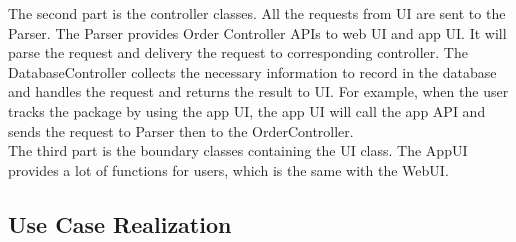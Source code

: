 \documentclass[12pt]{scrreprt}
\begin{document}
The second part is the controller classes. All the requests from UI are sent to the Parser. The Parser provides Order Controller APIs to web UI and app UI. It will parse the request and delivery the request to corresponding controller. The DatabaseController collects the necessary information to record in the database and handles the request and returns the result to UI. For example, when the user tracks the package by using the app UI, the app UI will call the app API and sends the request to Parser then to the OrderController.\\
The third part is the boundary classes containing the UI class. The AppUI provides a lot of functions for users, which is the same with the WebUI.

\subsection{Use Case Realization}
\end{document}
